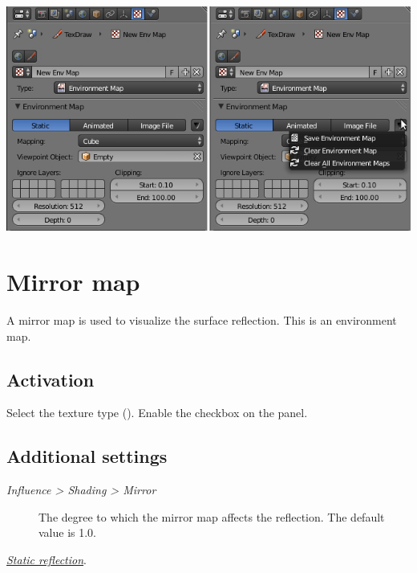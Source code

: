 \documentclass[a4paper,12pt,oneside]{sphinxmanual}
\begin{document}
{\hfill\includegraphics[width=1.000\linewidth]{environment_map_baking_ui.jpg}\hfill}


\section{Mirror map}
\label{textures:id19}\label{textures:mirror-map}\label{textures:index-11}
A mirror map is used to visualize the surface reflection. This is an environment map.


\subsection{Activation}
\label{textures:id20}
Select the  texture type (). Enable the  checkbox on the  panel.


\subsection{Additional settings}
\label{textures:id21}\begin{description}
\item[{\emph{Influence \textgreater{} Shading \textgreater{} Mirror}}] \leavevmode
The degree to which the mirror map affects the reflection. The default value is 1.0.

\end{description}




{\hyperref[materials:reflection-static]{\emph{Static reflection}}}.



\end{document}
